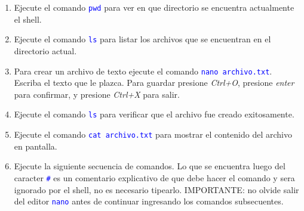 \documentclass[12pt]{article}
\newcommand{\cw}[1]{\texttt{\textcolor{blue}{#1}}}
\begin{document}
\begin{enumerate}[resume]

    \item Ejecute el comando \cw{pwd} para ver en que directorio se encuentra
        actualmente el shell.

    \item Ejecute el comando \cw{ls} para listar los archivos que se
        encuentran en el directorio actual.

    \item Para crear un archivo de texto ejecute el comando \cw{nano
        archivo.txt}. Escriba el texto que le plazca. Para guardar presione
        \emph{Ctrl+O}, presione \emph{enter} para confirmar, y presione
        \emph{Ctrl+X} para salir.

    \item Ejecute el comando \cw{ls} para verificar que el archivo fue creado
        exitosamente.

    \item Ejecute el comando \cw{cat archivo.txt} para mostrar el contenido
        del archivo en pantalla.

    \item Ejecute la siguiente secuencia de comandos. Lo que se encuentra
        luego del caracter \cw{\#} es un comentario explicativo de que debe
        hacer el comando y sera ignorado por el shell, no es necesario
        tipearlo. IMPORTANTE: no olvide salir del editor \cw{nano} antes de
        continuar ingresando los comandos subsecuentes.

    \begin{center}


\end{center}
\end{enumerate}
\end{document}
